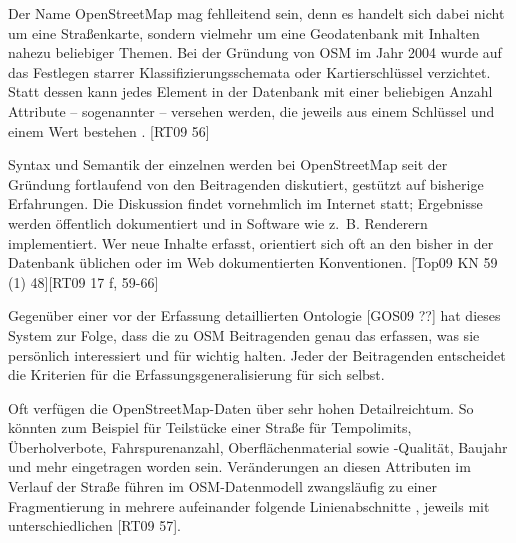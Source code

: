 \documentclass{../thesis}
\begin{document}


Der Name OpenStreetMap mag fehlleitend sein, denn es handelt sich dabei nicht um eine Straßenkarte, sondern vielmehr um eine Geodatenbank mit Inhalten nahezu beliebiger Themen. Bei der Gründung von OSM im Jahr 2004 wurde auf das Festlegen starrer Klassifizierungsschemata oder Kartierschlüssel verzichtet. Statt dessen kann jedes Element in der Datenbank mit einer beliebigen Anzahl Attribute – sogenannter  – versehen werden, die jeweils aus einem Schlüssel und einem Wert bestehen . [RT09 56]


Syntax und Semantik der einzelnen  werden bei OpenStreetMap seit der Gründung fortlaufend von den Beitragenden diskutiert, gestützt auf bisherige Erfahrungen. Die Diskussion findet vornehmlich im Internet statt; Ergebnisse werden öffentlich dokumentiert und in Software wie z.~B. Renderern implementiert. Wer neue Inhalte erfasst, orientiert sich oft an den bisher in der Datenbank üblichen oder im Web dokumentierten Konventionen. [Top09 KN 59 (1) 48][RT09 17 f, 59-66]

Gegenüber einer vor der Erfassung detaillierten Ontologie [GOS09 ??] hat dieses System zur Folge, dass die zu OSM Beitragenden genau das erfassen, was sie persönlich interessiert und für wichtig halten. Jeder der Beitragenden entscheidet die Kriterien für die Erfassungsgeneralisierung für sich selbst. %


Oft verfügen die OpenStreetMap-Daten über sehr hohen Detailreichtum. So könnten zum Beispiel für Teilstücke einer Straße  für Tempolimits, Überholverbote, Fahrspurenanzahl, Oberflächenmaterial sowie -Qualität, Baujahr und mehr eingetragen worden sein. Veränderungen an diesen Attributen im Verlauf der Straße führen im OSM-Datenmodell zwangsläufig zu einer Fragmentierung in mehrere aufeinander folgende Linienabschnitte , jeweils mit unterschiedlichen   [RT09 57].
\end{document}
